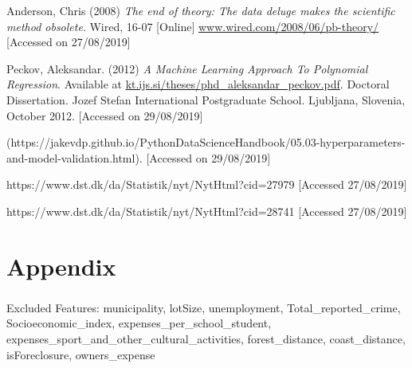 \documentclass[12pt,a4paper]{article}
\begin{document}
Anderson, Chris (2008) \textit{The end of theory: The data deluge makes the scientific method obsolete}. Wired, 16-07 [Online] \href{https://www.wired.com/2008/06/pb-theory/}{www.wired.com/2008/06/pb-theory/} [Accessed on 27/08/2019]\newline

Peckov, Aleksandar. (2012)  \textit{A Machine Learning Approach To Polynomial Regression}. Available at \href{http://kt.ijs.si/theses/phd_aleksandar_peckov.pdf}{kt.ijs.si/theses/phd\_aleksandar\_peckov.pdf}. Doctoral Dissertation. Jozef Stefan International Postgraduate School. Ljubljana, Slovenia, October 2012. [Accessed on 29/08/2019]

(https://jakevdp.github.io/PythonDataScienceHandbook/05.03-hyperparameters-and-model-validation.html). [Accessed on 29/08/2019]\newline

https://www.dst.dk/da/Statistik/nyt/NytHtml?cid=27979 [Accessed 27/08/2019]\newline

https://www.dst.dk/da/Statistik/nyt/NytHtml?cid=28741 [Accessed 27/08/2019]\newline
\newpage
\section{Appendix}
\subsubsection{}
Excluded Features:\newline
municipality, lotSize, unemployment, Total\_reported\_crime, Socioeconomic\_index, expenses\_per\_school\_student, expenses\_sport\_and\_other\_cultural\_activities, forest\_distance, coast\_distance, isForeclosure, owners\_expense
\end{document}
